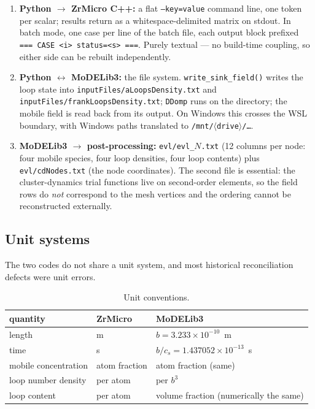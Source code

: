 \documentclass[11pt]{article}
\newcommand{\ZrM}{\textsf{ZrMicro}}
\newcommand{\MoD}{\textsf{MoDELib3}}
\newcommand{\code}[1]{\texttt{\small #1}}
\newcommand{\file}[1]{\texttt{\footnotesize #1}}
\begin{document}
\begin{enumerate}
\item \textbf{Python $\rightarrow$ \ZrM{} C++:} a flat \code{--key=value}
command line, one token per scalar; results return as a whitespace-delimited
matrix on stdout. In batch mode, one case per line of the batch file, each
output block prefixed \code{=== CASE <i> status=<s> ===}. Purely textual ---
no build-time coupling, so either side can be rebuilt independently.
\item \textbf{Python $\leftrightarrow$ \MoD{}:} the file system.
\code{write\_sink\_field()} writes the loop state into
\file{inputFiles/aLoopsDensity.txt} and
\file{inputFiles/frankLoopsDensity.txt}; \code{DDomp} runs on the directory;
the mobile field is read back from its output. On Windows this crosses the
WSL boundary, with Windows paths translated to
\file{/mnt/$\langle$drive$\rangle$/\ldots}.
\item \textbf{\MoD{} $\rightarrow$ post-processing:}
\file{evl/evl\_$N$.txt} (12 columns per node: four mobile species, four
loop densities, four loop contents) plus \file{evl/cdNodes.txt} (the node
coordinates). The second file is essential: the cluster-dynamics trial
functions live on second-order elements, so the field rows do \emph{not}
correspond to the mesh vertices and the ordering cannot be reconstructed
externally.
\end{enumerate}

\subsection{Unit systems}

The two codes do not share a unit system, and most historical
reconciliation defects were unit errors.

\begin{table}[htbp]
\centering
\caption{Unit conventions.}
\label{tab:units}
\begin{tabular}{@{}lll@{}}
\toprule
quantity & \ZrM{} & \MoD{} \\
\midrule
length & m & $b = 3.233\times10^{-10}$~m \\
time & s & $b/c_s = 1.437052\times10^{-13}$~s \\
mobile concentration & atom fraction & atom fraction (same) \\
loop number density & per atom & per $b^3$ \\
loop content & per atom & volume fraction (numerically the same) \\
\bottomrule
\end{tabular}
\end{table}
\end{document}
